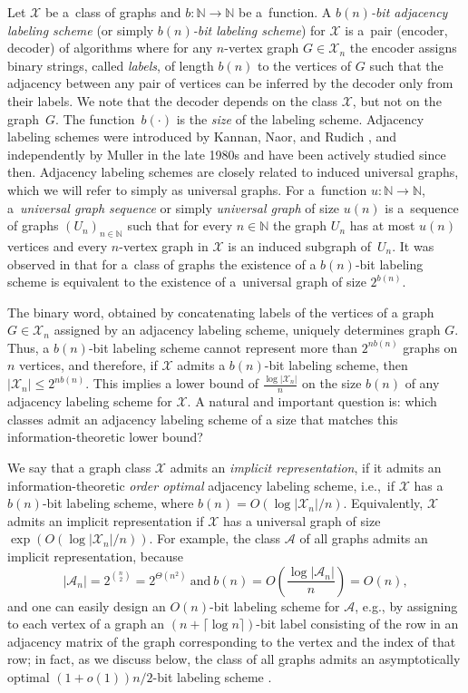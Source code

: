 \documentclass[letterpaper,11pt]{article}
\newcommand{\Nn}{\mathbb{N}}
\newcommand{\Ac}{\mathcal{A}}
\newcommand{\Xc}{\mathcal{X}}
\theoremstyle{definition}
\theoremstyle{remark}
\renewcommand{\leq}{\leqslant}
\begin{document}
	Let $\Xc$ be a~class of graphs and $b : \Nn \rightarrow \Nn$ be a~function. A \emph{$b(n)$-bit adjacency labeling scheme} (or simply \emph{$b(n)$-bit labeling scheme})  for $\Xc$ is a~pair (encoder, decoder) of algorithms where for any $n$-vertex graph $G\in \Xc_n$ the encoder assigns binary strings, called \emph{labels}, of length $b(n)$ to the vertices of $G$ such that the adjacency between any pair of vertices can be inferred by the decoder only from their labels.
	We note that the decoder depends on the class $\Xc$, but not on the graph~$G$.
	The function~$b(\cdot)$ is the \emph{size} of the labeling scheme.
	Adjacency labeling schemes were introduced by Kannan, Naor, and Rudich \cite{KNR88,KNR92},
	and independently by Muller \cite{Muller88} in the late 1980s and have been actively studied since then.
	Adjacency labeling schemes are closely related to induced universal graphs, which we will refer to simply as universal graphs.
	For a~function $u : \Nn \rightarrow \Nn$, a~\emph{universal graph sequence} or simply \emph{universal graph} of size $u(n)$ is a~sequence
	of graphs $(U_n)_{n\in \Nn}$ such that for every $n \in \Nn$ the graph $U_n$ has at most $u(n)$ vertices and every $n$-vertex graph in $\Xc$ is an induced subgraph of~$U_n$.
	It was observed in \cite{KNR92} that for a~class of graphs the existence of a $b(n)$-bit labeling scheme is equivalent to the existence of a~universal graph of size $2^{b(n)}$.
	
	The binary word, obtained by concatenating labels of the vertices of a graph $G \in \Xc_n$ assigned by an adjacency labeling scheme, uniquely determines graph $G$.
	Thus, a $b(n)$-bit labeling scheme cannot represent more than $2^{n b(n)}$ graphs on $n$ vertices, and therefore, if $\Xc$ admits a $b(n)$-bit labeling scheme, then $|\Xc_n| \leq 2^{n b(n)}$.
	This implies a lower bound of $\frac{\log |\Xc_n|}{n}$ on the size $b(n)$ of any adjacency labeling scheme for $\Xc$.
	A natural and important question is: which classes admit an adjacency labeling scheme of a size that matches this information-theoretic lower bound?
	
	We say that a graph class $\Xc$ admits an \emph{implicit representation}, if it admits an information-theoretic \emph{order optimal} adjacency labeling scheme, i.e.,\ if $\Xc$ has
	a $b(n)$-bit labeling scheme, where $b(n) = O(\log |\Xc_n|/n)$. 
	Equivalently, $\Xc$ admits an implicit representation if $\Xc$ has a universal graph of size $\exp(O(\log |\Xc_n|/n))$.
	For example, the class $\Ac$ of all graphs admits an implicit representation, because
        \[|\Ac_n| = 2^{\binom{n}{2}} = 2^{\Theta(n^2)}~\text{and}~b(n) = O\left(\frac{\log |\Ac_n|}{n}\right) = O(n),\]
        and one can easily design an $O(n)$-bit labeling scheme for $\Ac$, e.g., by assigning to each vertex of a graph an $(n + \lceil \log n \rceil)$-bit label consisting of the row in an adjacency matrix of the graph corresponding to the vertex and the index of that row; in fact, as we discuss below, the class of all graphs admits an asymptotically optimal $(1+o(1))n/2$-bit labeling scheme \cite{A17}.
	
\end{document}
